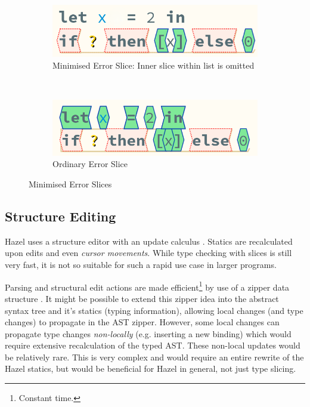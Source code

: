 \begin{figure}[h]
\centering
\begin{subfigure}{0.3\textwidth}
\centering

\includegraphics[width=1\textwidth]{Media/Figures/partially_inconsistent_compound}
\caption{Minimised Error Slice: Inner  slice within list is omitted}
\end{subfigure}$\qquad\qquad$
\begin{subfigure}{0.3\textwidth}
\centering

\includegraphics[width=1\textwidth]{Media/Figures/partially_inconsistent_compound_ordinary}
\caption{Ordinary Error Slice}
\end{subfigure}

\caption{Minimised Error Slices}
\label{fig:MinimisedSlice}
\end{figure}

\subsection{Structure Editing}\label{sec:StructureEditing}
Hazel uses a structure editor with an update calculus \cite{HazelStructureCalculus}. Statics are recalculated upon edits and even \textit{cursor movements}. While type checking with slices is still very fast, it is not so suitable for such a rapid use case in larger programs.

Parsing and structural edit actions are made efficient\footnote{Constant time.} by use of a zipper data structure \cite{HuetZipper, OneHoleContext}. It might be possible to extend this zipper idea into the abstract syntax tree and it's statics (typing information), allowing local changes (and type changes) to propagate in the AST zipper. However, some local changes can propagate type changes \textit{non-locally} (e.g. inserting a new binding) which would require extensive recalculation of the typed AST. These non-local updates would be relatively rare. This is very complex and would require an entire rewrite of the Hazel statics, but would be beneficial for Hazel in general, not just type slicing.
  

